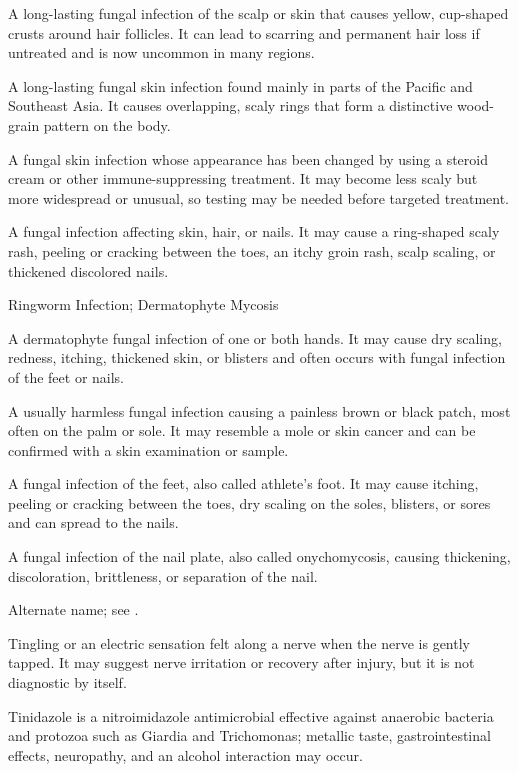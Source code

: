 A long-lasting fungal infection of the scalp or skin that causes yellow, cup-shaped crusts around hair follicles. It can lead to scarring and permanent hair loss if untreated and is now uncommon in many regions.

 A long-lasting fungal skin infection found mainly in parts of the Pacific and Southeast Asia. It causes overlapping, scaly rings that form a distinctive wood-grain pattern on the body.

 A fungal skin infection whose appearance has been changed by using a steroid cream or other immune-suppressing treatment. It may become less scaly but more widespread or unusual, so testing may be needed before targeted treatment.

 A fungal infection affecting skin, hair, or nails. It may cause a ring-shaped scaly rash, peeling or cracking between the toes, an itchy groin rash, scalp scaling, or thickened discolored nails.

\synonyms
Ringworm Infection; Dermatophyte Mycosis

 A dermatophyte fungal infection of one or both hands. It may cause dry scaling, redness, itching, thickened skin, or blisters and often occurs with fungal infection of the feet or nails.

 A usually harmless fungal infection causing a painless brown or black patch, most often on the palm or sole. It may resemble a mole or skin cancer and can be confirmed with a skin examination or sample.

 A fungal infection of the feet, also called athlete’s foot. It may cause itching, peeling or cracking between the toes, dry scaling on the soles, blisters, or sores and can spread to the nails.

 A fungal infection of the nail plate, also called onychomycosis, causing thickening, discoloration, brittleness, or separation of the nail.

 Alternate name; see .

 Tingling or an electric sensation felt along a nerve when the nerve is gently tapped. It may suggest nerve irritation or recovery after injury, but it is not diagnostic by itself.

 Tinidazole is a nitroimidazole antimicrobial effective against anaerobic bacteria and protozoa such as Giardia and Trichomonas; metallic taste, gastrointestinal effects, neuropathy, and an alcohol interaction may occur.

